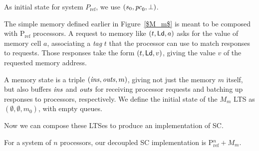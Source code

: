 As initial state for system $P_\text{ref}$, we use $(s_0, \mathit{pc}_0, \bot)$.


The simple memory defined earlier in Figure~\ref{$M_m$} is meant to be composed with P$_{\text{ref}}$
processors.  %
A request to memory like $(t, \mathsf{Ld}, a)$ asks
for the value of memory cell $a$, associating a \emph{tag} $t$ that the
processor can use to match responses to requests.  Those responses take the
form $(t, \mathsf{Ld}, v)$, giving the value $v$ of the requested memory address.

A memory state is a triple $(\mathit{ins}, \mathit{outs}, m)$, giving not just the
memory $m$ itself, but also buffers $\mathit{ins}$ and $\mathit{outs}$ for receiving
processor requests and batching up responses to processors,
respectively.  We define the initial state of the $M_m$ LTS as
$(\emptyset, \emptyset, m_0)$, with empty queues.


Now we can compose these LTSes to produce an implementation of SC. 

For a system of $n$ processors, our decoupled SC implementation is
$\text{P$^n_{\text{ref}}$} + M_m$.

